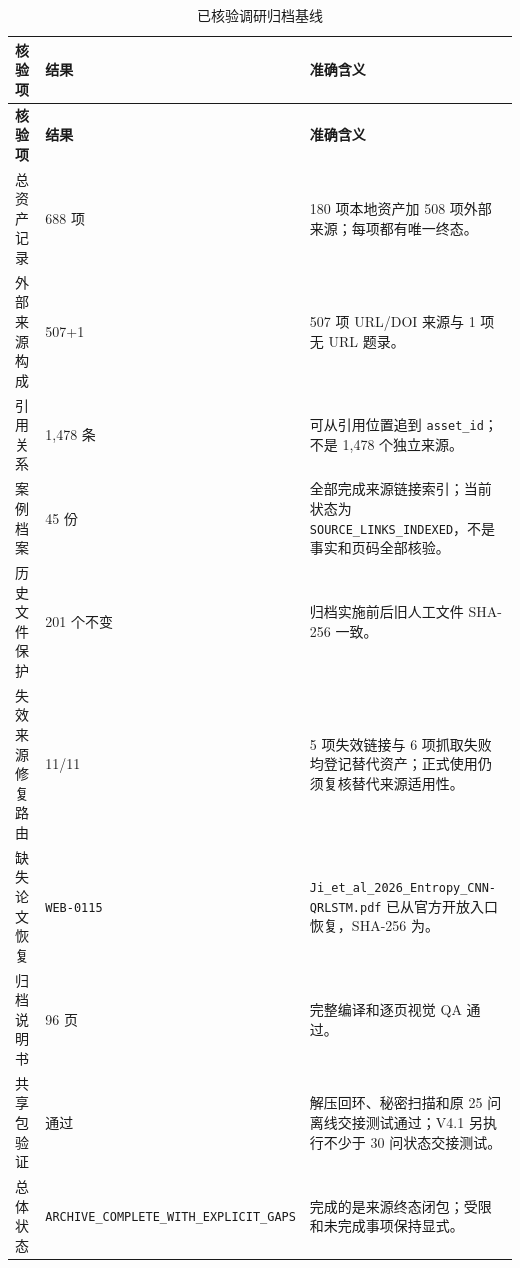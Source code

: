 \documentclass[UTF8,fontset=windows,12pt,openany]{ctexbook}
\newcommand{\Field}[1]{{\small\nolinkurl{#1}}}
\newcommand{\File}[1]{{\small\begingroup\urlstyle{same}\nolinkurl{#1}\endgroup}}
\begin{document}
\begin{longtable}{p{4.3cm}p{2.2cm}p{7.1cm}}
\caption{已核验调研归档基线}\label{tab:v41-archive-baseline}\\
\toprule
\textbf{核验项} & \textbf{结果} & \textbf{准确含义}\\
\midrule
\endfirsthead
\toprule \textbf{核验项} & \textbf{结果} & \textbf{准确含义}\\ \midrule
\endhead
总资产记录 & 688 项 & 180 项本地资产加 508 项外部来源；每项都有唯一终态。\\
外部来源构成 & 507+1 & 507 项 URL/DOI 来源与 1 项无 URL 题录。\\
引用关系 & 1,478 条 & 可从引用位置追到 \Field{asset_id}；不是 1,478 个独立来源。\\
案例档案 & 45 份 & 全部完成来源链接索引；当前状态为 \Field{SOURCE_LINKS_INDEXED}，不是事实和页码全部核验。\\
历史文件保护 & 201 个不变 & 归档实施前后旧人工文件 SHA-256 一致。\\
失效来源修复路由 & 11/11 & 5 项失效链接与 6 项抓取失败均登记替代资产；正式使用仍须复核替代来源适用性。\\
缺失论文恢复 & \Field{WEB-0115} & \File{Ji_et_al_2026_Entropy_CNN-QRLSTM.pdf} 已从官方开放入口恢复，SHA-256 为\newline\Field{696a7249e4992eaa}\newline\Field{6a94f61f66daae76}\newline\Field{184226e42b9bda00}\newline\Field{15d6b33da9b8e4eb}。\\
归档说明书 & 96 页 & 完整编译和逐页视觉 QA 通过。\\
共享包验证 & 通过 & 解压回环、秘密扫描和原 25 问离线交接测试通过；V4.1 另执行不少于 30 问状态交接测试。\\
总体状态 & \Field{ARCHIVE_COMPLETE_WITH_EXPLICIT_GAPS} & 完成的是来源终态闭包；受限和未完成事项保持显式。\\
\bottomrule
\end{longtable}
\end{document}
